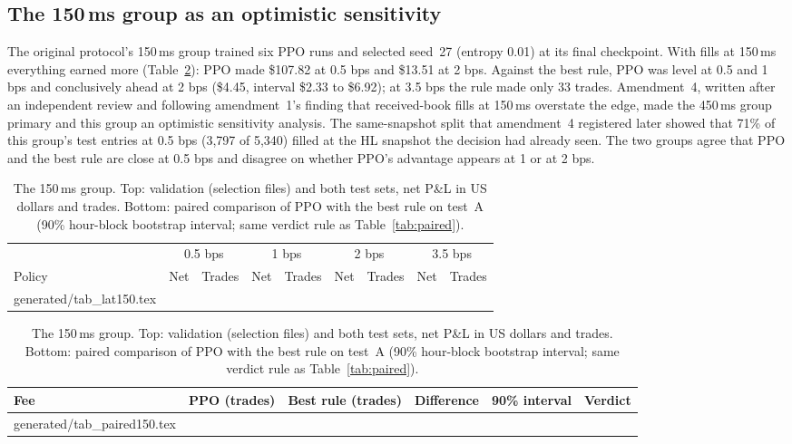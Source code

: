 \documentclass[12pt,a4paper]{article}
\makeatletter
\DeclareRobustCommand{\bps}{\ifmmode\,\text{bps}\else\,bps\fi}
\newcommand{\usd}[1]{\$#1}
\newcommand{\tabinput}[1]{\@@input #1 }
\makeatother
\begin{document}
\subsection{The \texorpdfstring{150\,ms}{150 ms} group as an optimistic sensitivity}
The original protocol's 150\,ms group trained six PPO runs and selected seed~27 (entropy
0.01) at its final checkpoint. With fills at 150\,ms everything earned more
(Table~\ref{tab:lat150}): PPO made \usd{107.82} at 0.5\bps{} and \usd{13.51} at 2\bps. Against
the best rule, PPO was level at 0.5 and 1\bps{} and conclusively ahead at 2\bps{}
(\usd{4.45}, interval \usd{2.33} to \usd{6.92}); at 3.5\bps{} the rule made only 33 trades.
Amendment~4, written after an independent review and following amendment~1's finding that
received-book fills at 150\,ms overstate the edge, made the 450\,ms group primary and this group
an optimistic sensitivity analysis. The same-snapshot split that amendment~4 registered later
showed that 71\% of this group's test entries at 0.5\bps{} (3,797 of 5,340) filled at the HL
snapshot the decision had already seen. The two groups agree that PPO and the best rule are
close at 0.5\bps{} and disagree on whether PPO's advantage appears at 1 or at 2\bps.

\begin{table}[!htbp]
\centering
\caption{The 150\,ms group. Top: validation (selection files) and both test sets, net P\&L in
US dollars and trades. Bottom: paired comparison of PPO with the best rule on test~A (90\%
hour-block bootstrap interval; same verdict rule as Table~\ref{tab:paired}).}
\label{tab:lat150}
\small
\setlength{\tabcolsep}{4.5pt}
\begin{tabular}{@{}lrrrrrrrr@{}}
\toprule
 & \multicolumn{2}{c}{0.5\bps} & \multicolumn{2}{c}{1\bps} & \multicolumn{2}{c}{2\bps} & \multicolumn{2}{c}{3.5\bps} \\
\cmidrule(lr){2-3}\cmidrule(lr){4-5}\cmidrule(lr){6-7}\cmidrule(l){8-9}
Policy & Net & Trades & Net & Trades & Net & Trades & Net & Trades \\
\midrule
\tabinput{generated/tab_lat150.tex}
\bottomrule
\end{tabular}

\vspace{8pt}
\begin{tabular}{@{}lrrrrl@{}}
\toprule
Fee & PPO (trades) & Best rule (trades) & Difference & 90\% interval & Verdict \\
\midrule
\tabinput{generated/tab_paired150.tex}
\bottomrule
\end{tabular}
\end{table}
\end{document}
